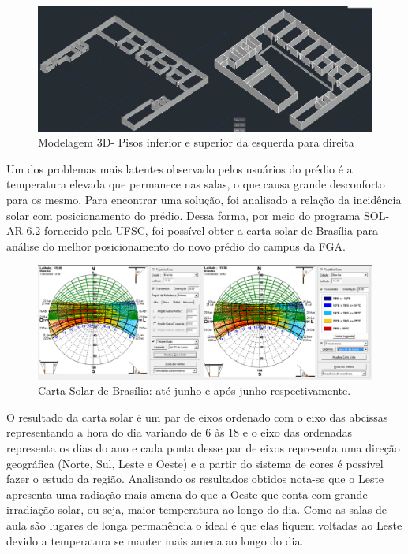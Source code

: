 \begin{figure}[!h]
  \centering
  \includegraphics[keepaspectratio=true,scale=0.3]{figuras/planta_3d_estruturas.eps}
  \caption{Modelagem 3D- Pisos inferior e superior da esquerda para direita}
  \label{fig:planta_3d_estruturas}
\end{figure}

Um dos problemas mais latentes observado pelos usuários do prédio é a temperatura elevada que permanece nas salas, o que causa grande desconforto para os mesmo. Para encontrar uma solução, foi analisado a relação da incidência solar com posicionamento do prédio. Dessa forma, por meio do programa SOL-AR 6.2 fornecido pela UFSC, foi possível obter a carta solar de Brasília para análise do melhor posicionamento do novo prédio do campus da FGA.

\begin{figure}[!h]
  \centering
  \includegraphics[keepaspectratio=true,scale=0.3]{figuras/carta_solar.eps}
  \caption{Carta Solar de Brasília: até junho e após junho respectivamente.}
  \label{fig:carta_solar}
\end{figure}

O resultado da carta solar é um par de eixos ordenado com o eixo das abcissas representando a hora do dia variando de 6 às 18 e o eixo das ordenadas representa os dias do ano e cada ponta desse par de eixos representa uma direção geográfica (Norte, Sul, Leste e Oeste) e a partir do sistema de cores é possível fazer o estudo da região. Analisando os resultados obtidos nota-se que o Leste apresenta uma radiação mais amena do que a Oeste que conta com grande irradiação solar, ou seja, maior temperatura ao longo do dia. Como as salas de aula são lugares de longa permanência o ideal é que elas fiquem voltadas ao Leste devido a temperatura se manter mais amena ao longo do dia.

